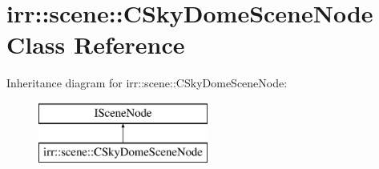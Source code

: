 \hypertarget{classirr_1_1scene_1_1_c_sky_dome_scene_node}{\section{irr\-:\-:scene\-:\-:C\-Sky\-Dome\-Scene\-Node Class Reference}
\label{classirr_1_1scene_1_1_c_sky_dome_scene_node}
}
Inheritance diagram for irr\-:\-:scene\-:\-:C\-Sky\-Dome\-Scene\-Node\-:\begin{figure}[H]
\begin{center}
\leavevmode
\includegraphics[height=2.000000cm]{classirr_1_1scene_1_1_c_sky_dome_scene_node}
\end{center}
\end{figure}
